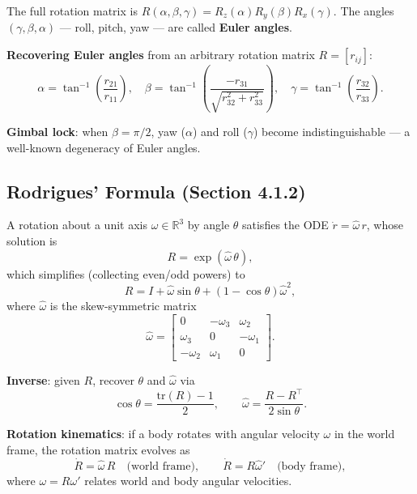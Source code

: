 \documentclass[12pt, a4paper]{article}
\begin{document}
The full rotation matrix is $R(\alpha,\beta,\gamma) = R_z(\alpha)R_y(\beta)R_x(\gamma)$.
The angles $(\gamma,\beta,\alpha)$ --- roll, pitch, yaw --- are called
\textbf{Euler angles}.

\textbf{Recovering Euler angles} from an arbitrary rotation matrix $R=[r_{ij}]$:
\begin{equation}
  \alpha = \tan^{-1}\!\left(\frac{r_{21}}{r_{11}}\right),\quad
  \beta  = \tan^{-1}\!\left(\frac{-r_{31}}{\sqrt{r_{32}^2+r_{33}^2}}\right),\quad
  \gamma = \tan^{-1}\!\left(\frac{r_{32}}{r_{33}}\right).
  \label{eq:euler_from_R}
\end{equation}

\textbf{Gimbal lock}: when $\beta=\pi/2$, yaw ($\alpha$) and roll
($\gamma$) become indistinguishable --- a well-known degeneracy of Euler
angles.

\subsection{Rodrigues' Formula (Section 4.1.2)}

A rotation about a unit axis $\omega\in\mathbb{R}^3$ by angle $\theta$
satisfies the ODE $\dot{r}=\hat{\omega}\,r$, whose solution is
\begin{equation}
  R = \exp(\hat{\omega}\,\theta),
  \label{eq:rodrigues_exp}
\end{equation}
which simplifies (collecting even/odd powers) to
\begin{equation}
  R = I + \hat{\omega}\sin\theta + (1-\cos\theta)\hat{\omega}^2,
  \label{eq:rodrigues}
\end{equation}
where $\hat{\omega}$ is the skew-symmetric matrix
\begin{equation}
  \hat{\omega} = \begin{bmatrix}0 & -\omega_3 & \omega_2\\ \omega_3 & 0 & -\omega_1\\ -\omega_2 & \omega_1 & 0\end{bmatrix}.
\end{equation}

\textbf{Inverse}: given $R$, recover $\theta$ and $\hat{\omega}$ via
\begin{equation}
  \cos\theta = \frac{\mathrm{tr}(R)-1}{2}, \qquad \hat{\omega} = \frac{R-R^\top}{2\sin\theta}.
  \label{eq:rodrigues_inv}
\end{equation}

\textbf{Rotation kinematics}: if a body rotates with angular velocity
$\omega$ in the world frame, the rotation matrix evolves as
\begin{equation}
  \dot{R} = \hat{\omega}\,R \quad\text{(world frame)}, \qquad
  \dot{R} = R\hat{\omega}' \quad\text{(body frame)},
  \label{eq:Rdot}
\end{equation}
where $\omega = R\omega'$ relates world and body angular velocities.
\end{document}
